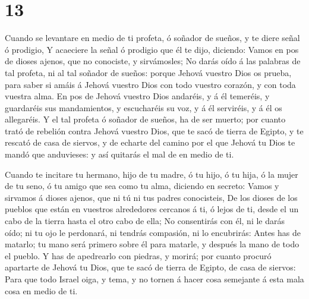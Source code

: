 \hypertarget{section-12}{%
\section{13}\label{section-12}}

 Cuando se levantare en medio de ti profeta, ó soñador de
sueños, y te diere señal ó prodigio,  Y acaeciere la señal ó
prodigio que él te dijo, diciendo: Vamos en pos de dioses ajenos, que no
conociste, y sirvámosles;  No darás oído á las palabras de
tal profeta, ni al tal soñador de sueños: porque Jehová vuestro Dios os
prueba, para saber si amáis á Jehová vuestro Dios con todo vuestro
corazón, y con toda vuestra alma.  En pos de Jehová vuestro
Dios andaréis, y á él temeréis, y guardaréis sus mandamientos, y
escucharéis su voz, y á él serviréis, y á él os allegaréis. 
Y el tal profeta ó soñador de sueños, ha de ser muerto; por cuanto trató
de rebelión contra Jehová vuestro Dios, que te sacó de tierra de Egipto,
y te rescató de casa de siervos, y de echarte del camino por el que
Jehová tu Dios te mandó que anduvieses: y así quitarás el mal de en
medio de ti.

 Cuando te incitare tu hermano, hijo de tu madre, ó tu hijo,
ó tu hija, ó la mujer de tu seno, ó tu amigo que sea como tu alma,
diciendo en secreto: Vamos y sirvamos á dioses ajenos, que ni tú ni tus
padres conocisteis,  De los dioses de los pueblos que están
en vuestros alrededores cercanos á ti, ó lejos de ti, desde el un cabo
de la tierra hasta el otro cabo de ella;  No consentirás con
él, ni le darás oído; ni tu ojo le perdonará, ni tendrás compasión, ni
lo encubrirás:  Antes has de matarlo; tu mano será primero
sobre él para matarle, y después la mano de todo el pueblo.
 Y has de apedrearlo con piedras, y morirá; por cuanto
procuró apartarte de Jehová tu Dios, que te sacó de tierra de Egipto, de
casa de siervos:  Para que todo Israel oiga, y tema, y no
tornen á hacer cosa semejante á esta mala cosa en medio de ti.

